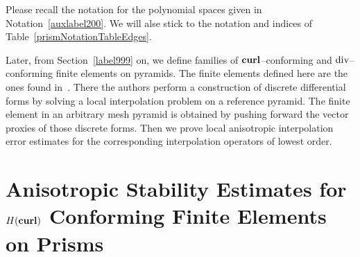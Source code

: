 Please recall 
the notation for the polynomial spaces given in Notation~\ref{auxlabel200}. We 
will alse stick to the notation and indices of 
Table~\ref{prismNotationTableEdges}.

Later, from Section~\ref{label999} on, we define families of
$\textbf{curl}$--conforming and $\operatorname{\textrm{div}}$--conforming finite elements on pyramids.
The finite elements defined here 
are the ones found in~\cite{gh99}. There the authors
perform a
construction of discrete differential
forms by solving a local interpolation problem on a reference pyramid. The
finite element in an arbitrary mesh pyramid is obtained by pushing forward
the vector proxies of those discrete forms.
Then we prove local anisotropic interpolation error estimates for the
corresponding interpolation operators of lowest order.

\section{An\-iso\-tropic Stability Estimates for $H(\textbf{curl})$ Conforming Finite
Elements on Prisms}
\label{stab_edge_prism}




